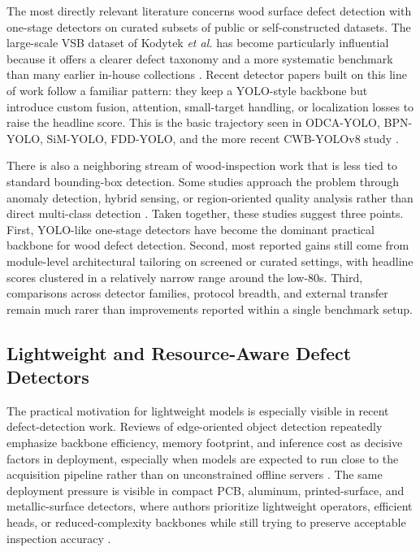 The most directly relevant literature concerns wood surface defect detection with one-stage detectors on curated subsets of public or self-constructed datasets. The large-scale VSB dataset of Kodytek \textit{et al.} has become particularly influential because it offers a clearer defect taxonomy and a more systematic benchmark than many earlier in-house collections \citep{kodytek_dataset}. Recent detector papers built on this line of work follow a familiar pattern: they keep a YOLO-style backbone but introduce custom fusion, attention, small-target handling, or localization losses to raise the headline score. This is the basic trajectory seen in ODCA-YOLO, BPN-YOLO, SiM-YOLO, FDD-YOLO, and the more recent CWB-YOLOv8 study \citep{odca_yolo,bpn_yolo,sim_yolo,fdd_yolo,an_cwb_yolov8}.

There is also a neighboring stream of wood-inspection work that is less tied to standard bounding-box detection. Some studies approach the problem through anomaly detection, hybrid sensing, or region-oriented quality analysis rather than direct multi-class detection \citep{kilic_2024,kilic_2025_wd_detector,cmc_wood_area_attention}. Taken together, these studies suggest three points. First, YOLO-like one-stage detectors have become the dominant practical backbone for wood defect detection. Second, most reported gains still come from module-level architectural tailoring on screened or curated settings, with headline scores clustered in a relatively narrow range around the low-80s. Third, comparisons across detector families, protocol breadth, and external transfer remain much rarer than improvements reported within a single benchmark setup.

\subsection{Lightweight and Resource-Aware Defect Detectors}

The practical motivation for lightweight models is especially visible in recent defect-detection work. Reviews of edge-oriented object detection repeatedly emphasize backbone efficiency, memory footprint, and inference cost as decisive factors in deployment, especially when models are expected to run close to the acquisition pipeline rather than on unconstrained offline servers \citep{mittal_2024}. The same deployment pressure is visible in compact PCB, aluminum, printed-surface, and metallic-surface detectors, where authors prioritize lightweight operators, efficient heads, or reduced-complexity backbones while still trying to preserve acceptable inspection accuracy \citep{cmc_pcb_yolov8,cmc_yolo_rlc,cmc_cg_yolov8,cmc_aluminum_yolov8n,cmc_printed_positive,cmc_channel_shuffle}. 

